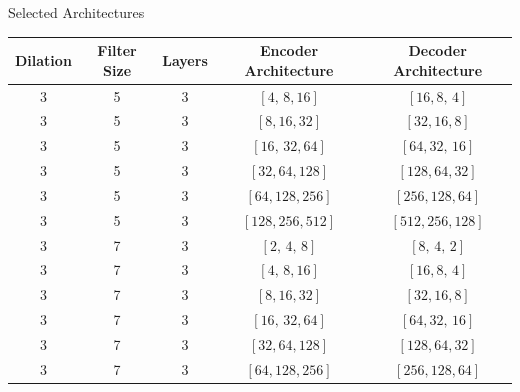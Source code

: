 \documentclass[8pt,xcolor=dvipsnames,compress]{beamer}
\begin{document}
\begin{frame}{Selected Architectures}
\footnotesize
\begin{table}[h!]
    \centering
    \renewcommand{\arraystretch}{1.4}
    \begin{tabular}{|c|c|c|c|c|}
    \hline
    \textbf{Dilation} & \textbf{Filter Size} & \textbf{Layers} & \textbf{Encoder Architecture} & \textbf{Decoder Architecture} \\
    \hline
        3 & 5 & 3 & $[4,\,8,16]$ & $[16,8,\,4]$ \\
        3 & 5 & 3 & $[8,16,32]$ & $[32,16,8]$ \\
        3 & 5 & 3 & $[16,\,32,64]$ & $[64,32,\,16]$ \\
        3 & 5 & 3 & $[32,64,128]$ & $[128,64,32]$ \\
        3 & 5 & 3 & $[64,128,256]$ & $[256,128,64]$ \\
        3 & 5 & 3 & $[128,256,512]$ & $[512,256,128]$ \\
        \hline
        3 & 7 & 3 & $[2,\,4,\,8]$ & $[8,\,4,\,2]$ \\
        3 & 7 & 3 & $[4,\,8,16]$ & $[16,8,\,4]$ \\
        3 & 7 & 3 & $[8,16,32]$ & $[32,16,8]$ \\
        3 & 7 & 3 & $[16,\,32,64]$ & $[64,32,\,16]$ \\
        3 & 7 & 3 & $[32,64,128]$ & $[128,64,32]$ \\
        3 & 7 & 3 & $[64,128,256]$ & $[256,128,64]$ \\
        \hline
        \end{tabular}
    \label{tab:tcn_architectures}
\end{table}
\end{frame}
% 
\end{document}

